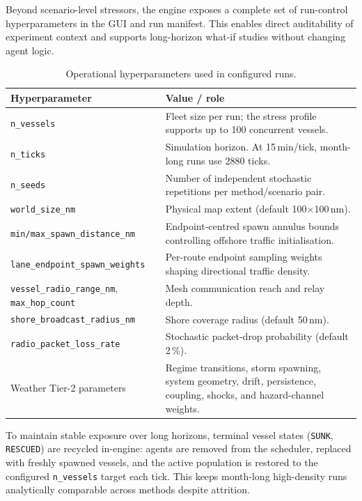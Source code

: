 \documentclass[cameraready]{Interspeech}
\begin{document}
Beyond scenario-level stressors, the engine exposes a complete set of run-control hyperparameters in the GUI and run manifest. This enables direct auditability of experiment context and supports long-horizon what-if studies without changing agent logic.

\begin{table}[htbp]
    \caption{Operational hyperparameters used in configured runs.}
    \label{tab:operational-hparams}
    \centering
    \small
    \begin{tabularx}{16cm}{@{}lX@{}}
        \toprule
        Hyperparameter & Value / role \\
        \midrule
        \texttt{n\_vessels} & Fleet size per run; the stress profile supports up to 100 concurrent vessels. \\
        \texttt{n\_ticks} & Simulation horizon. At 15\,min/tick, month-long runs use 2880 ticks. \\
        \texttt{n\_seeds} & Number of independent stochastic repetitions per method/scenario pair. \\
        \texttt{world\_size\_nm} & Physical map extent (default 100$\times$100\,nm). \\
        \texttt{min/max\_spawn\_distance\_nm} & Endpoint-centred spawn annulus bounds controlling offshore traffic initialisation. \\
        \texttt{lane\_endpoint\_spawn\_weights} & Per-route endpoint sampling weights shaping directional traffic density. \\
        \texttt{vessel\_radio\_range\_nm}, \texttt{max\_hop\_count} & Mesh communication reach and relay depth. \\
        \texttt{shore\_broadcast\_radius\_nm} & Shore coverage radius (default 50\,nm). \\
        \texttt{radio\_packet\_loss\_rate} & Stochastic packet-drop probability (default 2\,\%). \\
        Weather Tier-2 parameters & Regime transitions, storm spawning, system geometry, drift, persistence, coupling, shocks, and hazard-channel weights. \\
        \bottomrule
    \end{tabularx}
\end{table}

To maintain stable exposure over long horizons, terminal vessel states (\texttt{SUNK}, \texttt{RESCUED}) are recycled in-engine: agents are removed from the scheduler, replaced with freshly spawned vessels, and the active population is restored to the configured \texttt{n\_vessels} target each tick. This keeps month-long high-density runs analytically comparable across methods despite attrition.
\end{document}
